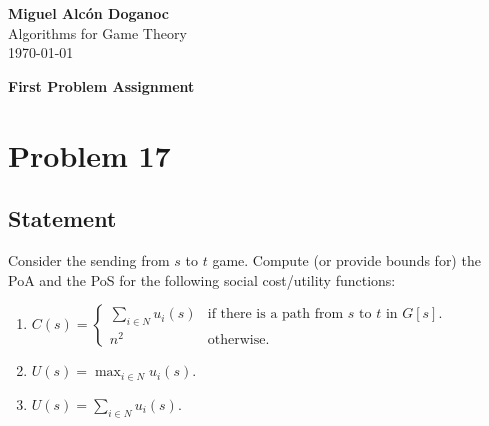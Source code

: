 \documentclass[a4paper, 11pt]{article}
\begin{document}
\noindent
\begin{flushright}
    \large\textbf{Miguel Alcón Doganoc} \\
    Algorithms for Game Theory \\
    \today
\end{flushright}

\noindent
{\huge{\textbf{First Problem Assignment}}}

\section*{Problem 17}
{\color{statement}
\subsection*{Statement}
Consider the sending from $s$ to $t$ game. Compute (or provide bounds for) the PoA and the PoS for the following social cost/utility functions:
\begin{enumerate}[label=(\alph*)]
    \item $C(s) = \begin{cases}
        \sum_{i\in N} u_i(s) & \text{if there is a path from $s$ to $t$ in $G[s]$.} \\
        n^2 & \text{otherwise.}
    \end{cases}$
    \item $U(s) = \max_{i\in N} u_i(s)$.
    \item $U(s) = \sum_{i\in N} u_i(s)$.
\end{enumerate}

}
\end{document}
